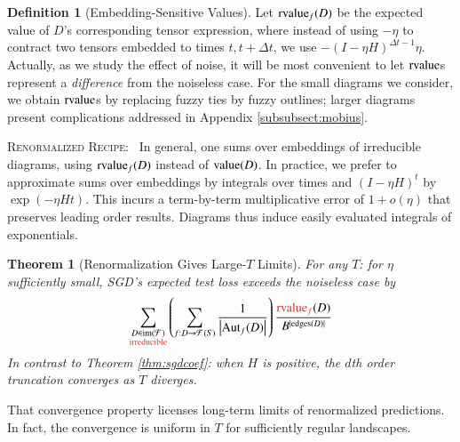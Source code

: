 \documentclass{article}
\theoremstyle{plain}
\newtheorem{thm}{Theorem}
\theoremstyle{definition}
\newtheorem{defn}{Definition}
\newcommand{\wrap}[1]{\left(#1\right)}
\newcommand{\wabs}[1]{\left|#1\right|}
\newcommand{\Free}{\mathcal{F}}
\newcommand{\Aut}{\text{\textnormal{Aut}}}
\newcommand{\image}{\text{\textnormal{im}}}
\newcommand{\dvalue}{\text{\textnormal{value}}}
\newcommand{\rvalue}{\text{\textnormal{rvalue}}}
\newcommand{\edges}{\text{\textnormal{edges}}}
\begin{document}
        \begin{defn}[Embedding-Sensitive Values]
            \label{defn:rvalue}
            Let $\rvalue_f(D)$ be the expected value of $D$'s corresponding
            tensor expression, where instead of using $-\eta$ to contract
            two tensors embedded to times $t, t+\Delta t$, we use
            $
                -(I-\eta H)^{\Delta t - 1} \eta
            $.
            Actually, as we study the effect of noise, it will be most
            convenient to let $\rvalue$s represent a \emph{difference} from the
            noiseless case.  For the small diagrams we consider, we obtain
            $\rvalue$s by replacing fuzzy ties by fuzzy outlines; larger
            diagrams present complications addressed in
            Appendix \ref{subsubsect:mobius}.
        \end{defn}

        \textsc{Renormalized Recipe:}~
            In general, one sums over embeddings of irreducible diagrams, using
            $\rvalue_f(D)$ instead of $\dvalue(D)$.  In practice, we prefer to
            approximate sums over embeddings by integrals over times and
            $(I-\eta H)^t$ by $\exp(- \eta H t)$.  This incurs a term-by-term
            multiplicative error of $1 + o(\eta)$ that preserves leading order
            results.  Diagrams thus induce easily evaluated integrals of
            exponentials.
       
        \begin{thm}[Renormalization Gives Large-$T$ Limits] \label{thm:renorm}
            For any $T$: for $\eta$ sufficiently small, SGD's expected test
            loss exceeds the noiseless case by 
            \begin{equation*} \label{eq:renorm}
                \sum_{\substack{D \in \image(\Free)\\ \text{\color{moor} irreducible}}}
                \wrap{
                    \sum_{f: D\to\Free(S)}
                    \frac{1}{\wabs{\Aut_f(D)}}
                }
                \frac{{\color{moor} \rvalue_f}(D)}{B^{|\edges(D)|}}
            \end{equation*}
            In contrast to Theorem \ref{thm:sgdcoef}: when $H$ is positive, the
            $d$th order truncation converges as $T$ diverges.
        \end{thm}
        That convergence property licenses long-term limits of renormalized
        predictions.  In fact, the convergence is uniform in $T$ for
        sufficiently regular landscapes.
\end{document}
